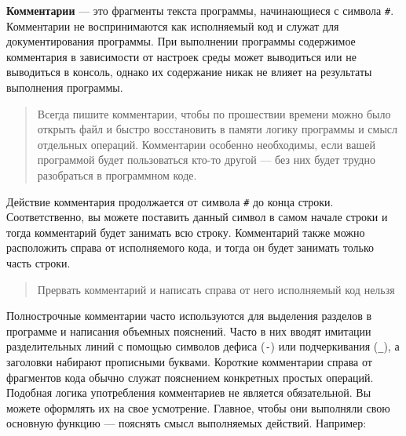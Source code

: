 \documentclass[]{book}
\newenvironment{Shaded}{\begin{snugshade}}{\end{snugshade}}
\newcommand{\DecValTok}[1]{\textcolor[rgb]{0.00,0.00,0.81}{#1}}
\newcommand{\StringTok}[1]{\textcolor[rgb]{0.31,0.60,0.02}{#1}}
\newcommand{\CommentTok}[1]{\textcolor[rgb]{0.56,0.35,0.01}{\textit{#1}}}
\newcommand{\OperatorTok}[1]{\textcolor[rgb]{0.81,0.36,0.00}{\textbf{#1}}}
\newcommand{\NormalTok}[1]{#1}
\begin{document}
\textbf{Комментарии} --- это фрагменты текста программы, начинающиеся с
символа \texttt{\#}. Комментарии не воспринимаются как исполняемый код и
служат для документирования программы. При выполнении программы
содержимое комментария в зависимости от настроек среды может выводиться
или не выводиться в консоль, однако их содержание никак не влияет на
результаты выполнения программы.

\begin{quote}
Всегда пишите комментарии, чтобы по прошествии времени можно было
открыть файл и быстро восстановить в памяти логику программы и смысл
отдельных операций. Комментарии особенно необходимы, если вашей
программой будет пользоваться кто-то другой --- без них будет трудно
разобраться в программном коде.
\end{quote}

Действие комментария продолжается от символа \texttt{\#} до конца
строки. Соответственно, вы можете поставить данный символ в самом начале
строки и тогда комментарий будет занимать всю строку. Комментарий также
можно расположить справа от исполняемого кода, и тогда он будет занимать
только часть строки.

\begin{quote}
Прервать комментарий и написать справа от него исполняемый код нельзя
\end{quote}

Полнострочные комментарии часто используются для выделения разделов в
программе и написания объемных пояснений. Часто в них вводят имитации
разделительных линий с помощью символов дефиса (\texttt{-}) или
подчеркивания (\texttt{\_}), а заголовки набирают прописными буквами.
Короткие комментарии справа от фрагментов кода обычно служат пояснением
конкретных простых операций. Подобная логика употребления комментариев
не является обязательной. Вы можете оформлять их на свое усмотрение.
Главное, чтобы они выполняли свою основную функцию --- пояснять смысл
выполняемых действий. Например:

\begin{Shaded}
\end{Shaded}
\end{document}
